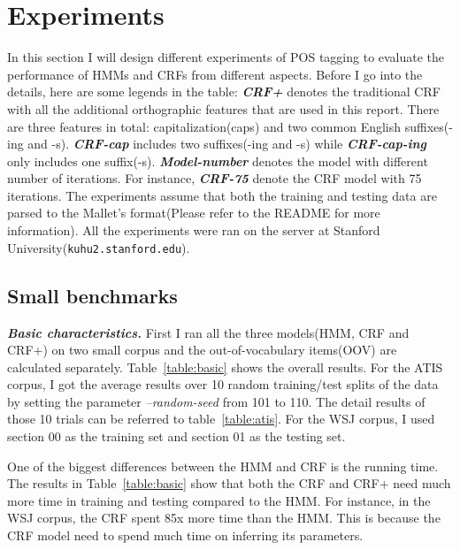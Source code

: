 \documentclass[10pt]{article}
\begin{document}
\section{Experiments}\label{sec:exp}
In this section I will design different experiments of POS tagging to evaluate the performance of HMMs and CRFs from different aspects. Before I go into the details, here are some legends in the table:
{\bf \emph{CRF+}} denotes the traditional CRF with all the additional orthographic features that are used in this report. There are three features in total: capitalization(caps) and two common English suffixes(-ing and -s). {\bf \emph{CRF-cap}} includes two suffixes(-ing and -s) while {\bf \emph{CRF-cap-ing}} only includes one suffix(-s).  {\bf \emph{Model-number}} denotes the model with different number of iterations. For instance, {\bf \emph{CRF-75}} denote the CRF model with 75 iterations. The experiments assume that both the training and testing data are parsed to the Mallet's format(Please refer to the README for more information). All the experiments were ran on the server at Stanford University(\texttt{kuhu2.stanford.edu}).



\subsection{Small benchmarks}
{\bf \emph{Basic characteristics.}} First I ran all the three models(HMM, CRF and CRF+) on two small corpus and the out-of-vocabulary items(OOV) are calculated separately. Table~\ref{table:basic} shows the overall results. For the ATIS corpus, I got the average results over 10 random training/test splits of the data by setting the parameter \emph{--random-seed} from 101 to 110. The detail results of those 10 trials can be referred to table~\ref{table:atis}.  For the WSJ corpus, I used section 00 as the training set and section 01 as the testing set.

One of the biggest differences between the HMM and CRF is the running time. The results in Table~\ref{table:basic} show that both the CRF and CRF+ need much more time in training and testing compared to the HMM. For instance, in the WSJ corpus, the CRF spent 85x more time than the HMM. This is because the CRF model need to spend much time on inferring its parameters.
\end{document}
